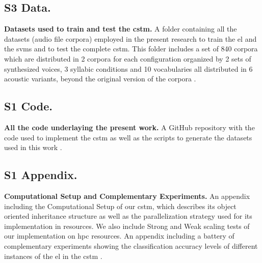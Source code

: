 {\subsection{S3 Data.}
\label{S3_Data}
{\bf Datasets used to train and test the \gls{cstm}.} A folder containing all the datasets (audio file corpora) employed in the present research to train the \gls{el} and the \glspl{svm} and to test the complete \gls{cstm}. This folder includes a set of 840 corpora which are distributed in 2 corpora for each configuration organized by 2 sets of synthesized voices, 3 syllabic conditions and 10 vocabularies all distributed in 6 acoustic variants, beyond the original version of the corpora \cite{dematties_dario_2019_2576130}.

\subsection{S1 Code.}
\label{S1_Code}
{\bf All the code underlaying the present work.} A GitHub repository with the code used to implement the \gls{cstm} as well as the scripts to generate the datasets used in this work \cite{dematties_dario_2019_2580396}.

\subsection{S1 Appendix.}
\label{S1_Appendix}
{\bf Computational Setup and Complementary Experiments.} An appendix including the Computational Setup of our \gls{cstm}, which describes its object oriented inheritance structure as well as the parallelization strategy used for its implementation in  resources. We also include Strong and Weak scaling tests of our implementation on \gls{hpc} resources. An appendix including a battery of complementary experiments showing the classification accuracy levels of different instances of the \gls{el} in the \gls{cstm} \cite{dematties_dario_2019_2654939}.
}

